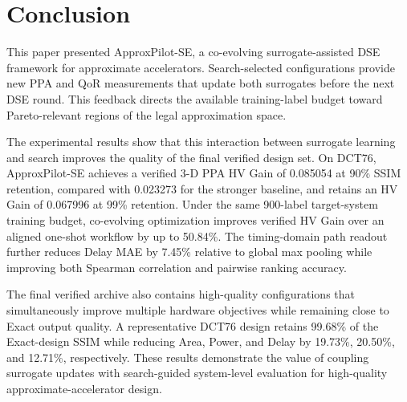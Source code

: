 \section{Conclusion}
\label{sec:conclusion}

This paper presented ApproxPilot-SE, a co-evolving surrogate-assisted
DSE framework for approximate accelerators. Search-selected
configurations provide new PPA and QoR measurements that update both
surrogates before the next DSE round. This feedback directs the
available training-label budget toward Pareto-relevant regions
of the legal approximation space.

The experimental results show that this interaction between surrogate
learning and search improves the quality of the final verified design
set. On DCT76, ApproxPilot-SE achieves a verified 3-D PPA HV Gain of
0.085054 at 90\% SSIM retention, compared with 0.023273 for the
stronger baseline, and retains an HV Gain of 0.067996 at 99\%
retention. Under the same 900-label target-system training budget,
co-evolving optimization improves verified HV Gain over an aligned
one-shot workflow by up to 50.84\%. The timing-domain path readout
further reduces Delay MAE by 7.45\% relative to global max pooling
while improving both Spearman correlation and pairwise ranking
accuracy.

The final verified archive also contains high-quality configurations
that simultaneously improve multiple hardware objectives while
remaining close to Exact output quality. A representative DCT76
design retains 99.68\% of the Exact-design SSIM while reducing Area,
Power, and Delay by 19.73\%, 20.50\%, and 12.71\%, respectively.
These results demonstrate the value of coupling surrogate updates
with search-guided system-level evaluation for high-quality
approximate-accelerator design.

